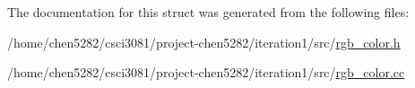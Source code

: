 The documentation for this struct was generated from the following files\+:\begin{DoxyCompactItemize}
\item 
/home/chen5282/csci3081/project-\/chen5282/iteration1/src/\hyperlink{rgb__color_8h}{rgb\+\_\+color.\+h}\item 
/home/chen5282/csci3081/project-\/chen5282/iteration1/src/\hyperlink{rgb__color_8cc}{rgb\+\_\+color.\+cc}\end{DoxyCompactItemize}
